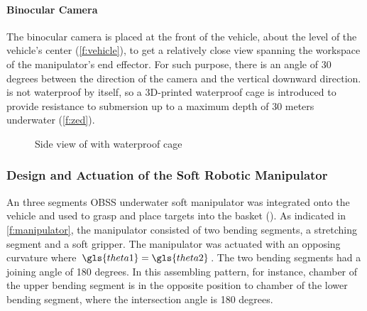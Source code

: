 \paragraph{Binocular Camera}

The  binocular camera is placed at the front of the vehicle,
about the level of the vehicle's center (\autoref{f:vehicle}), to get a relatively close view spanning
the workspace of the manipulator's end effector. For such purpose, there is an
angle of 30 degrees between the direction of the camera and the vertical
downward direction.  is not waterproof by itself, so a 3D-printed
waterproof cage is introduced to provide resistance to submersion up to a
maximum depth of 30 meters underwater (\autoref{f:zed}).

\begin{figure}[htb]
    \caption[Side View of ZED with waterproof cage]{Side view of 
    with waterproof cage}\label{f:zed}
\end{figure}

\subsubsection{Design and Actuation of the Soft Robotic Manipulator}

An three segments \gls{OBSS}  underwater soft manipulator was integrated onto
the vehicle and used to grasp and place targets into the basket
(\cite{gong2021soft}). As indicated in \autoref{f:manipulator}, the manipulator
consisted of two bending segments, a stretching segment and a soft gripper. The
manipulator was actuated with an opposing curvature where
\(\gls{theta1}=\gls{theta2}\). The two bending segments had a joining angle of
180 degrees. In this assembling pattern, for instance, chamber of
the upper bending segment is in the opposite position to chamber
of the lower bending segment, where the intersection angle is 180 degrees.

